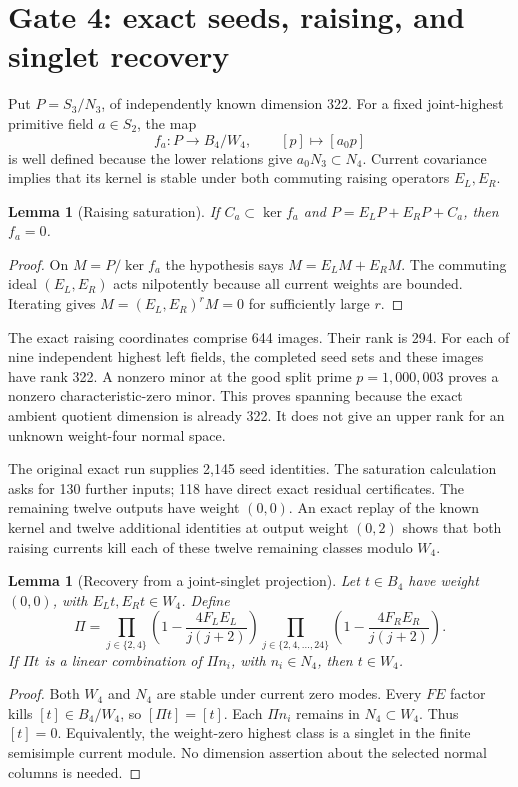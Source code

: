 \documentclass[11pt,a4paper]{article}
\newtheorem{lemma}[theorem]{Lemma}
\theoremstyle{definition}
\begin{document}
\section{Gate 4: exact seeds, raising, and singlet recovery}\label{sec:gate4}
Put \(P=S_3/N_3\), of independently known dimension 322. For a fixed
joint-highest primitive field \(a\in S_2\), the map
\[
 f_a:P\longrightarrow B_4/W_4,\qquad [p]\longmapsto[a_0p]
\]
is well defined because the lower relations give \(a_0N_3\subset N_4\).
Current covariance implies that its kernel is stable under both commuting
raising operators \(E_L,E_R\).

\begin{lemma}[Raising saturation]\label{lem:raising}
If \(C_a\subset\ker f_a\) and
\(P=E_LP+E_RP+C_a\), then \(f_a=0\).
\end{lemma}
\begin{proof}
On \(M=P/\ker f_a\) the hypothesis says
\(M=E_LM+E_RM\). The commuting ideal \((E_L,E_R)\) acts nilpotently
because all current weights are bounded. Iterating gives
\(M=(E_L,E_R)^rM=0\) for sufficiently large \(r\).
\end{proof}

The exact raising coordinates comprise 644 images. Their rank is 294.
For each of nine independent highest left fields, the completed seed
sets and these images have rank 322. A nonzero minor at the good split
prime \(p=1{,}000{,}003\) proves a nonzero characteristic-zero minor.
This proves spanning because the exact ambient quotient dimension is
already 322. It does not give an upper rank for an unknown weight-four
normal space.

The original exact run supplies 2,145 seed identities. The saturation
calculation asks for 130 further inputs; 118 have direct exact residual
certificates. The remaining twelve outputs have weight \((0,0)\).
An exact replay of the known kernel and twelve additional identities
at output weight \((0,2)\) shows that both raising currents kill each
of these twelve remaining classes modulo \(W_4\).

\begin{lemma}[Recovery from a joint-singlet projection]\label{lem:singlet}
Let \(t\in B_4\) have weight \((0,0)\), with
\(E_Lt,E_Rt\in W_4\). Define
\begin{equation}\label{eq:projector}
 \Pi=\prod_{j\in\{2,4\}}
       \left(1-\frac{4F_LE_L}{j(j+2)}\right)
       \prod_{j\in\{2,4,\ldots,24\}}
       \left(1-\frac{4F_RE_R}{j(j+2)}\right).
\end{equation}
If \(\Pi t\) is a linear combination of \(\Pi n_i\), with
\(n_i\in N_4\), then \(t\in W_4\).
\end{lemma}
\begin{proof}
Both \(W_4\) and \(N_4\) are stable under current zero modes.
Every \(FE\) factor kills \([t]\in B_4/W_4\), so
\([\Pi t]=[t]\). Each \(\Pi n_i\) remains in \(N_4\subset W_4\).
Thus \([t]=0\). Equivalently, the weight-zero highest class is a singlet
in the finite semisimple current module. No dimension assertion about
the selected normal columns is needed.
\end{proof}
\end{document}
